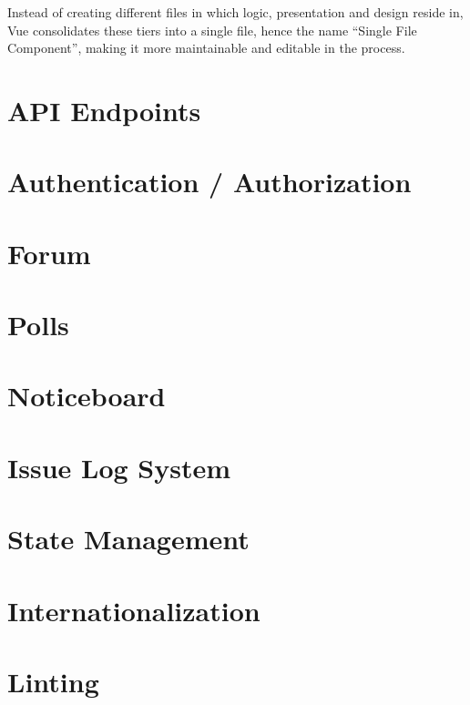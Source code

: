 Instead of creating different files in which logic, presentation and design reside in, Vue consolidates these tiers into a single file, hence the name “Single File Component”, making it more maintainable and editable in the process.

\section{API Endpoints}

\section{Authentication / Authorization}

\section{Forum}

\section{Polls}

\section{Noticeboard}

\section{Issue Log System}

\section{State Management}

\section{Internationalization}

\section{Linting}